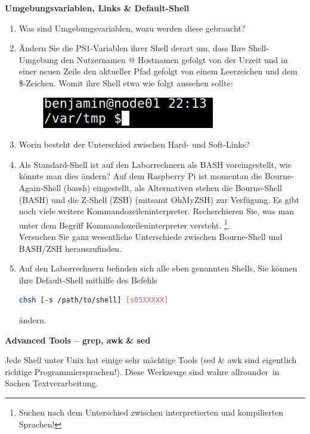 \documentclass[paper=a4,fontsize=11pt]{scrartcl}%
\numberwithin{equation}{section}
\begin{document}
\begin{center}\Large{\textbf{Umgebungsvariablen, Links \& Default-Shell}}\end{center}\vskip0.25in
\begin{enumerate}
\item Was sind Umgebungsvariablen, wozu werden diese gebraucht?
\item Ändern Sie die PS1-Variablen ihrer Shell derart um, dass Ihre Shell-Umgebung den Nutzernamen @ Hostnamen gefolgt von der Urzeit und in einer neuen Zeile den aktueller Pfad gefolgt von einem Leerzeichen und dem \$-Zeichen. Womit ihre Shell etwa wie folgt aussehen sollte:
\begin{figure}[H]
\includegraphics[scale=0.6]{ps1}
\end{figure}
\item Worin besteht der Unterschied zwischen Hard- und Soft-Links?
\item Als Standard-Shell ist auf den Laborrechnern als BASH voreingestellt, wie könnte man dies ändern? Auf dem Raspberry Pi ist momentan die Bourne-Again-Shell (bassh) eingestellt, als Alternativen stehen die Bourne-Shell (BASH) und die Z-Shell (ZSH) (mitsamt OhMyZSH) zur Verfügung. Es gibt noch viele weitere Kommandozeileninterpreter. Recherchieren Sie, was man unter dem Begriff Kommandozeileninterpreter versteht. \footnote{Suchen nach dem Unterschied zwischen interpretierten und kompilierten Sprachen!}.\\
Versuchen Sie ganz wesentliche Unterschiede zwischen Bourne-Shell und BASH/ZSH herauszufinden.
\item Auf den Laborrechnern befinden sich alle eben genannten Shells, Sie können ihre Default-Shell mithilfe des Befehls\\
    \begin{lstlisting}[style=Bash, language=Bash]
chsh [-s /path/to/shell] [s05XXXXX]
		\end{lstlisting}
		ändern. 
\end{enumerate}
\begin{center}\Large{\textbf{Advanced Tools -- grep, awk \& sed}}\end{center}\vskip0.25in
Jede Shell unter Unix hat einige sehr mächtige Tools (sed \& awk sind eigentlich richtige Programmiersprachen!). Diese Werkzeuge sind wahre \glqq allrounder\grqq\ in Sachen Textverarbeitung.
\end{document}
